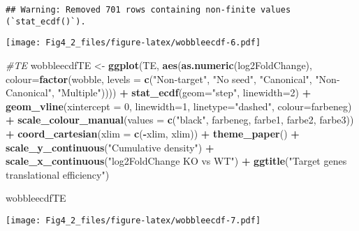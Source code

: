 \documentclass[
]{article}
\newenvironment{Shaded}{\begin{snugshade}}{\end{snugshade}}
\newcommand{\AttributeTok}[1]{\textcolor[rgb]{0.13,0.29,0.53}{#1}}
\newcommand{\CommentTok}[1]{\textcolor[rgb]{0.56,0.35,0.01}{\textit{#1}}}
\newcommand{\DecValTok}[1]{\textcolor[rgb]{0.00,0.00,0.81}{#1}}
\newcommand{\FunctionTok}[1]{\textcolor[rgb]{0.13,0.29,0.53}{\textbf{#1}}}
\newcommand{\NormalTok}[1]{#1}
\newcommand{\OtherTok}[1]{\textcolor[rgb]{0.56,0.35,0.01}{#1}}
\newcommand{\SpecialCharTok}[1]{\textcolor[rgb]{0.81,0.36,0.00}{\textbf{#1}}}
\newcommand{\StringTok}[1]{\textcolor[rgb]{0.31,0.60,0.02}{#1}}
\begin{document}
\begin{verbatim}
## Warning: Removed 701 rows containing non-finite values (`stat_ecdf()`).
\end{verbatim}

\texttt{[image: Fig4\_2\_files/figure-latex/wobbleecdf-6.pdf]}

\begin{Shaded}
\begin{Highlighting}[]
\CommentTok{\#TE}
\NormalTok{wobbleecdfTE }\OtherTok{\textless{}{-}} \FunctionTok{ggplot}\NormalTok{(TE, }\FunctionTok{aes}\NormalTok{(}\FunctionTok{as.numeric}\NormalTok{(log2FoldChange), }\AttributeTok{colour=}\FunctionTok{factor}\NormalTok{(wobble, }\AttributeTok{levels =} \FunctionTok{c}\NormalTok{(}\StringTok{"Non{-}target"}\NormalTok{, }\StringTok{"No seed"}\NormalTok{, }\StringTok{"Canonical"}\NormalTok{, }\StringTok{"Non{-}Canonical"}\NormalTok{, }\StringTok{"Multiple"}\NormalTok{)))) }\SpecialCharTok{+} 
  \FunctionTok{stat\_ecdf}\NormalTok{(}\AttributeTok{geom=}\StringTok{"step"}\NormalTok{, }\AttributeTok{linewidth=}\DecValTok{2}\NormalTok{) }\SpecialCharTok{+}
  \FunctionTok{geom\_vline}\NormalTok{(}\AttributeTok{xintercept =} \DecValTok{0}\NormalTok{, }\AttributeTok{linewidth=}\DecValTok{1}\NormalTok{, }\AttributeTok{linetype=}\StringTok{"dashed"}\NormalTok{, }\AttributeTok{colour=}\NormalTok{farbeneg) }\SpecialCharTok{+}
  \FunctionTok{scale\_colour\_manual}\NormalTok{(}\AttributeTok{values =} \FunctionTok{c}\NormalTok{(}\StringTok{"black"}\NormalTok{, farbeneg, farbe1, farbe2, farbe3)) }\SpecialCharTok{+}
  \FunctionTok{coord\_cartesian}\NormalTok{(}\AttributeTok{xlim =} \FunctionTok{c}\NormalTok{(}\SpecialCharTok{{-}}\NormalTok{xlim, xlim)) }\SpecialCharTok{+} 
  \FunctionTok{theme\_paper}\NormalTok{() }\SpecialCharTok{+}
  \FunctionTok{scale\_y\_continuous}\NormalTok{(}\StringTok{"Cumulative density"}\NormalTok{) }\SpecialCharTok{+} \FunctionTok{scale\_x\_continuous}\NormalTok{(}\StringTok{"log2FoldChange KO vs WT"}\NormalTok{) }\SpecialCharTok{+}
  \FunctionTok{ggtitle}\NormalTok{(}\StringTok{"Target genes translational efficiency"}\NormalTok{)}

\NormalTok{wobbleecdfTE}
\end{Highlighting}
\end{Shaded}

\texttt{[image: Fig4\_2\_files/figure-latex/wobbleecdf-7.pdf]}
\end{document}
